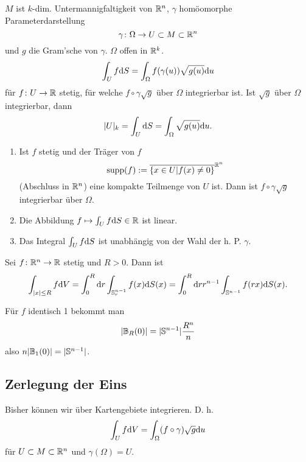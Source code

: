 $M$ ist $k$-dim. Untermannigfaltigkeit von $\mathbb{R}^n$, $\gamma$ homöomorphe Parameterdarstellung
\[\gamma \colon \Omega \to U \subset M \subset \mathbb{R}^n\]
und $g$ die Gram'sche von $\gamma$. $\Omega$ offen in $\mathbb{R}^k$. 
\[\int_U f \mathrm{d} S = \int_\Omega f(\gamma(u)) \sqrt{g(u)} \mathrm{d} u\]
für $f \colon U \to \mathbb{R}$ stetig, für welche $f \circ \gamma \sqrt{g}$ über $\Omega$ integrierbar ist. Ist $\sqrt{g}$ über $\Omega$ integrierbar, dann
\[|U|_k = \int_U \mathrm{d} S = \int_\Omega \sqrt{g(u)} \mathrm{d} u.\]
\begin{rem}
	\begin{enumerate}
		\item Ist $f$ stetig und der Träger von $f$
		\[\mathrm{supp}(f) := \overline{\{x \in U | f(x) \neq 0\}}^{\mathbb{R}^n}\]
		(Abschluss in $\mathbb{R}^n$) eine kompakte Teilmenge von $U$ ist. Dann ist $f \circ \gamma \sqrt{g}$ integrierbar über $\Omega$.
		\item Die Abbildung $f \mapsto \int_U f \mathrm{d} S \in \mathbb{R}$ ist linear.
		\item Das Integral $\int_U f \mathrm{d} S$ ist unabhängig von der Wahl der h. P. $\gamma$.
	\end{enumerate}
\end{rem}
\begin{satz}\label{satz3_8}
	Sei $f \colon \mathbb{R}^n \to \mathbb{R}$ stetig und $R > 0$. Dann ist
	\[\int_{|x| \leq R} f \mathrm{d} V = \int_0^R \mathrm{d} r \int_{\mathbb{S}_r^{n-1}} f(x) \mathrm{d} S(x) = \int_0^R \mathrm{d} r r^{n-1} \int_{\mathbb{S}^{n-1}} f(rx) \mathrm{d} S(x).\]
\end{satz}
Für $f$ identisch 1 bekommt man
\[|\mathbb{B}_R(0)| = |\mathbb{S}^{n-1}| \frac{R^n}{n}\]
also $n|\mathbb{B}_1(0)| = |\mathbb{S}^{n-1}|$.

\subsection{Zerlegung der Eins}
Bisher können wir über Kartengebiete integrieren. D. h.
\[\int_U f \mathrm{d} V = \int_\Omega (f \circ \gamma)\sqrt{g} \mathrm{d} u\]
für $U \subset M \subset \mathbb{R}^n$ und $\gamma(\Omega) = U$. 

